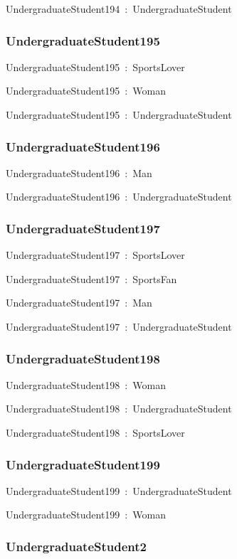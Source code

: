 \documentclass{article}
\begin{document}
UndergraduateStudent194~:~UndergraduateStudent

\subsubsection*{UndergraduateStudent195}

UndergraduateStudent195~:~SportsLover

UndergraduateStudent195~:~Woman

UndergraduateStudent195~:~UndergraduateStudent

\subsubsection*{UndergraduateStudent196}

UndergraduateStudent196~:~Man

UndergraduateStudent196~:~UndergraduateStudent

\subsubsection*{UndergraduateStudent197}

UndergraduateStudent197~:~SportsLover

UndergraduateStudent197~:~SportsFan

UndergraduateStudent197~:~Man

UndergraduateStudent197~:~UndergraduateStudent

\subsubsection*{UndergraduateStudent198}

UndergraduateStudent198~:~Woman

UndergraduateStudent198~:~UndergraduateStudent

UndergraduateStudent198~:~SportsLover

\subsubsection*{UndergraduateStudent199}

UndergraduateStudent199~:~UndergraduateStudent

UndergraduateStudent199~:~Woman

\subsubsection*{UndergraduateStudent2}
\end{document}
